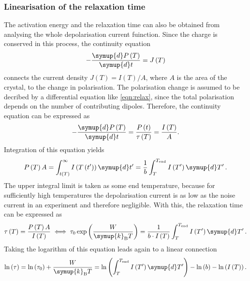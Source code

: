 \subsubsection{Linearisation of the relaxation time}
%
The activation energy and the relaxation time can also be obtained from analysing the whole depolarisation current fuinction.
Since the charge is conserved in this process, the continuity equation
\begin{equation*}
    -\frac{\symup{d}P\left(T\right)}{\symup{d}t} = J\left(T\right)
\end{equation*}
connects the current density $J\left(T\right) = I\left(T\right)/A$, where $A$ is the area of the crystal, to the change in polarisation.
The polarisation change is assumed to be decribed by a differential equation like \autoref{eqn:relax}, since the total polarisation depends on the number of contributing dipoles.
Therefore, the continuity equation can be expressed as
\begin{equation*}
    -\frac{\symup{d}P\left(T\right)}{\symup{d}t} = \frac{P\left(t\right)}{\tau\left(T\right)} = \frac{I\left(T\right)}{A}.
\end{equation*}
Integration of this equation yields
\begin{equation*}
    P\left(T\right)A = \int_{t\left(T\right)}^{\infty} I\left(T\left(t'\right)\right)\symup{d}t' = \frac{1}{b} \int_{T}^{T_{\mathrm{end}}} I\left(T'\right)\symup{d}T'\,.
\end{equation*}
The upper integral limit is taken as some end temperature, because for sufficiently high temperatures the depolarisation current is as low as the noise current in an experiment and therefore negligible.
With this, the relaxation time can be expressed as
\begin{equation*}
    \tau\left(T\right) = \frac{P\left(T\right)A}{I\left(T\right)} \iff \tau_0\exp{\left(\frac{W}{\symup{k}_{\mathrm{B}}T}\right)} = \frac{1}{b\cdot I\left(T\right)} \int_{T}^{T_{\mathrm{end}}} I\left(T'\right)\symup{d}T'\,.
\end{equation*}
Taking the logarithm of this equation leads again to a linear connection
\begin{equation}
    \ln{\left(\tau\right)} = \ln{\left(\tau_0\right)} + \frac{W}{\symup{k}_{\mathrm{B}}T} = \ln{\left(\int_{T}^{T_{\mathrm{end}}} I\left(T'\right)\symup{d}T'\right)} - \ln{\left(b\right)} - \ln{\left(I\left(T\right)\right)}\,.
    \label{eqn:lin_tau}
\end{equation}
%
%

